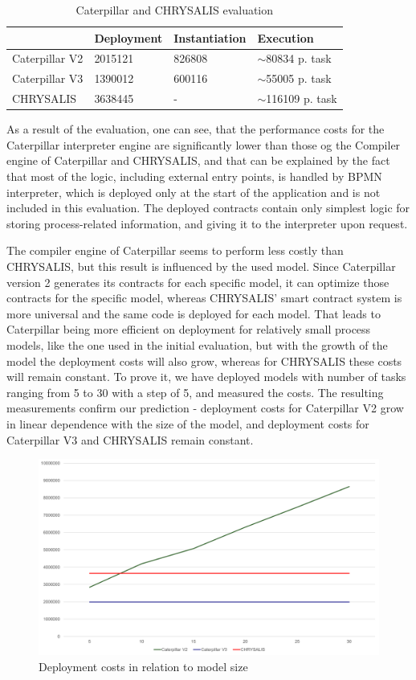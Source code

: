\begin{table}[hbt]
	\begin{tabular}{|l|l|l|l|}
		\hline
		& Deployment & Instantiation & Execution            \\ \hline
		Caterpillar V2 & 2015121    & 826808        & $\sim$80834 p. task  \\ \hline
		Caterpillar V3 & 1390012    & 600116        & $\sim$55005 p. task  \\ \hline
		CHRYSALIS      & 3638445    & -             & $\sim$116109 p. task \\ \hline
	\end{tabular}
	\caption{Caterpillar and CHRYSALIS evaluation}
	\label{tab:caterpillar:eval:eval}
\end{table}
As a result of the evaluation, one can see, that the performance costs for the Caterpillar interpreter engine are significantly lower than those og the Compiler engine of Caterpillar and CHRYSALIS, and that can be explained by the fact that most of the logic, including external entry points, is handled by BPMN interpreter, which is deployed only at the start of the application and is not included in this evaluation. The deployed contracts contain only simplest logic for storing process-related information, and giving it to the interpreter upon request.

The compiler engine of Caterpillar seems to perform less costly than CHRYSALIS, but this result is influenced by the used model. Since Caterpillar version 2 generates its contracts for each specific model, it can optimize those contracts for the specific model, whereas CHRYSALIS' smart contract system is more universal and the same code is deployed for each model. That leads to Caterpillar being more efficient on deployment for relatively small process models, like the one used in the initial evaluation, but with the growth of the model the deployment costs will also grow, whereas for CHRYSALIS these costs will remain constant. To prove it, we have deployed models with number of tasks ranging from 5 to 30 with a step of 5, and measured the costs. The resulting measurements confirm our prediction - deployment costs for Caterpillar V2 grow in linear dependence with the size of the model, and deployment costs for Caterpillar V3 and CHRYSALIS remain constant.

\begin{figure}[hbt]
	\includegraphics[width=\textwidth]{gfx/caterpillar-eval-graph}
	\caption{Deployment costs in relation to model size}
	\label{fig:caterpillar:eval:graph}
\end{figure}

